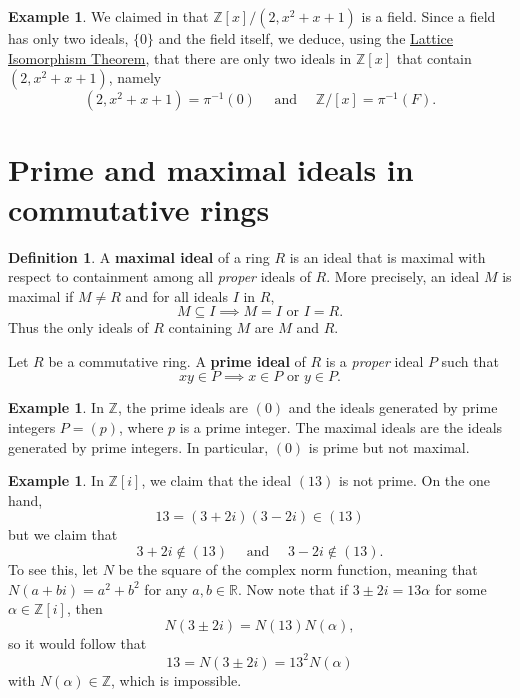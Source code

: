 \documentclass[12pt]{report}
\numberwithin{equation}{section}
\numberwithin{theorem}{chapter}
\theoremstyle{definition}
\newtheorem{definition}[theorem]{Definition}
\newtheorem{example}[theorem]{Example}
\newtheorem*{basic properties}{Basic Properties}
\newtheorem*{Important Remark}{Important Remark}
\newcommand{\df}[1]{{\bf #1}\index{#1}}
\newcommand{\R}{\mathbb{R}}
\newcommand{\Z}{\mathbb{Z}}
\begin{document}
\begin{example} 
 We claimed in  that $\Z[x]/(2, x^2+x+1)$ is a field. Since a field has only two ideals, $\{0\}$ and the field itself, we deduce, using the \hyperref[lattice iso rings]{Lattice Isomorphism Theorem}, that there are only two ideals in $\Z[x]$ that contain $(2, x^2+ x+1)$, namely 
$$(2, x^2+ x+1)=\pi^{-1}(0) \quad \text{ and } \quad \Z/[x]=\pi^{-1}(F).$$
\end{example}



\section{Prime and maximal ideals in commutative rings}

\begin{definition}
A \df{maximal ideal} of a ring $R$ is an ideal that is maximal with respect to containment among all {\em proper} ideals of $R$. More precisely, an ideal $M$ is maximal if $M \neq R$ and for all ideals $I$ in $R$,
$$M \subseteq I \implies M = I \text{ or } I = R.$$
Thus the only ideals of $R$ containing $M$ are $M$ and $R$.
 
Let $R$ be a commutative ring.
A \df{prime ideal} of $R$ is a {\em proper} ideal $P$ such that
$$xy \in P \implies x \in P \text{ or } y \in P.$$ 
\end{definition}


\begin{example}
In $\Z$, the prime ideals are $(0)$ and the ideals generated by prime integers $P=(p)$, where $p$ is a prime integer. The maximal ideals are the ideals generated by prime integers. In particular, $(0)$ is prime but not maximal.
\end{example}


\begin{example}
In $\Z[i]$, we claim that the ideal $(13)$ is not prime. On the one hand, 
$$13=(3+2i)(3-2i)\in(13)$$
but we claim that
$$3+2i \notin (13) \quad \text{ and } \quad 3-2i \notin (13).$$ 
To see this, let $N$ be the square of the complex norm function, meaning that $N(a+bi) = a^2 + b^2$ for any $a, b \in \R$.
Now note that if $3\pm 2i = 13 \alpha$ for some $\alpha \in \Z[i]$, then
$$N(3\pm 2i)=N(13)N(\alpha),$$ 
so it would follow that 
$$13= N(3\pm 2i) = 13^2 N(\alpha)$$ 
with $N(\alpha) \in \Z$, which is impossible.
\end{example}
\end{document}
